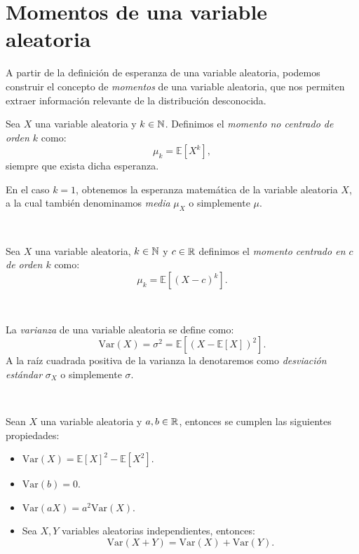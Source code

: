 \documentclass[oneside,openright,titlepage,numbers=noenddot,openany,headinclude,footinclude=true,
cleardoublepage=empty,abstractoff,BCOR=5mm,paper=a4,fontsize=12pt,main=spanish]{scrreprt}
\begin{document}
\clearpage

\section{Momentos de una variable aleatoria}

A partir de la definición de esperanza de una variable aleatoria, podemos construir el concepto de \textit{momentos} de una variable aleatoria, que nos permiten extraer información relevante de la distribución desconocida.\\

\begin{definition}
Sea $X$ una variable aleatoria y $k\in \mathbb N$. Definimos el \textit{momento no centrado de orden $k$} como: $$\mu_k=\mathbb{E}[X^k],$$
siempre que exista dicha esperanza.\\
\begin{remark}
En el caso $k=1$, obtenemos la esperanza matemática de la variable aleatoria $X$, a la cual también denominamos \textit{media} $\mu_X$ o simplemente $\mu$.
\end{remark}
\end{definition}\

\begin{definition}
Sea $X$ una variable aleatoria, $k\in \mathbb N$ y $c\in \mathbb{R}$ definimos el \textit{momento centrado en $c$ de orden $k$} como: $$\mu_k=\mathbb{E}[(X-c)^k].$$
\end{definition}\

\begin{definition}[Varianza]
La \textit{varianza} de una variable aleatoria se define como: $$\text{Var}(X)=\sigma
^2=\mathbb{E}\left[(X-\mathbb{E}[X])^2\right].$$
A la raíz cuadrada positiva de la varianza la denotaremos como \textit{desviación estándar} $\sigma_X$ o simplemente $\sigma$.
\end{definition}\

\begin{proposition}
Sean $X$ una variable aleatoria y $a,b\in \mathbb{R}$, entonces se cumplen las siguientes propiedades:
\begin{itemize}
    \item $\text{Var}(X)=\mathbb{E}[X]^2-\mathbb{E}[X^2].$
    \item $\text{Var}(b)=0.$
    \item $\text{Var}(aX)=a^2\text{Var}(X).$
    \item Sea $X,Y$ variables aleatorias independientes, entonces: $$\text{Var}(X+Y)=\text{Var}(X)+\text{Var}(Y).$$
\end{itemize}
\end{proposition}\
\end{document}
